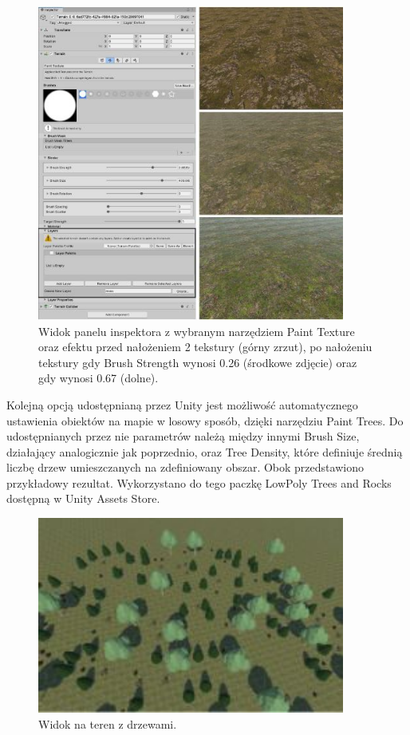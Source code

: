 \begin{figure}[htbp]
    \centering
    \includegraphics[width=0.9\textwidth]{images/modelowanie_terenu/tekstury.jpg}
    \caption{Widok panelu inspektora z wybranym narzędziem Paint Texture oraz efektu przed nałożeniem 2 tekstury (górny zrzut), po nałożeniu tekstury gdy Brush Strength wynosi 0.26 (środkowe zdjęcie) oraz gdy wynosi 0.67 (dolne).}\label{fig:malowanie_tekstur}
\end{figure}

Kolejną opcją udostępnianą przez Unity jest możliwość automatycznego ustawienia obiektów na mapie w losowy sposób, dzięki narzędziu Paint Trees. Do udostępnianych przez nie parametrów należą między innymi Brush Size, działający analogicznie jak poprzednio, oraz Tree Density, które definiuje średnią liczbę drzew umieszczanych na zdefiniowany obszar. Obok przedstawiono przykładowy rezultat. Wykorzystano do tego paczkę LowPoly Trees and Rocks dostępną w Unity Assets Store.

\begin{figure}[htbp]
    \centering
    \includegraphics[width=0.9\textwidth]{images/modelowanie_terenu/drzewa.jpg}
    \caption{Widok na teren z drzewami.}\label{fig:pomalowane_drzewa}
\end{figure}

